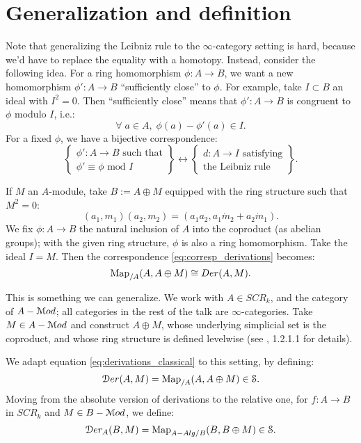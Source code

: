 \section{Generalization and definition}
\label{sect:cc_def}

Note that generalizing the Leibniz rule to the $\infty$-category setting is hard, because we'd have to replace the 
equality with a homotopy.
Instead, consider the following idea. For a ring homomorphism $\phi : A \to B$, we want a new homomorphism $\phi': A \to B$ 
``sufficiently close'' to $\phi$. For example, take $I \subset B$ an ideal
with $I^2 = 0$. Then ``sufficiently close'' means that $\phi' : A \to B$ is congruent to $\phi$ modulo $I$, i.e.:
\[	\forall\; a \in A,\; \phi(a) - \phi'(a) \in I.	\]
For a fixed $\phi$, we have a bijective correspondence:
\begin{equation}
\label{eq:corresp_derivations}
\left\{ \begin{array} {c} \phi': A \to B \text{ such that} \\ \phi' \equiv \phi \text{ mod } I \end{array} \right\}
\longleftrightarrow
\left\{ \begin{array} {c} d: A \to I \text{ satisfying} \\ \text{the Leibniz rule} \end{array} \right\} .
\end{equation}


If $M$ an $A$-module, take $B := A \oplus M$ equipped with 
the ring structure such that $M^2 = 0$:
\[	(a_1, m_1) (a_2,m_2) = (a_1 a_2, a_1 \dot m_2 + a_2\dot m_1).	\]
We fix $\phi : A \to B$ the natural inclusion of $A$ into the coproduct (as abelian groups); with the given ring structure,
$\phi$ is also a ring homomorphism. Take the ideal $I = M$. Then the correspondence \ref{eq:corresp_derivations} becomes:
\begin{equation}
\label{eq:derivations_classical}
\operatorname{Map}_{/A}(A, A\oplus M) \cong Der(A,M).
\end{equation}


This is something we can generalize. We work with $A \in SCR_k$, and the category of $A-\mathcal M od$; all categories in the rest of
the talk are $\infty$-categories. Take $M \in A-\mathcal M od$ and construct $A \oplus M$, whose underlying simplicial set is the
coproduct, and whose ring structure is defined levelwise (see \cite{HAG-II}, 1.2.1.1 for details).

We adapt equation \ref{eq:derivations_classical} to this setting, by defining:
\[	\mathcal D er(A,M) = \operatorname{Map}_{/A}(A,A\oplus M) \in \mathcal S.	\]
Moving from the absolute version of derivations to the relative one, for $f : A \to B$ in $SCR_k$ and $M \in B-\mathcal M od$, we 
define: 
\[	\mathcal D er_A (B,M) = \operatorname{Map}_{A-Alg/B}(B, B\oplus M)\in \mathcal S.	\]


